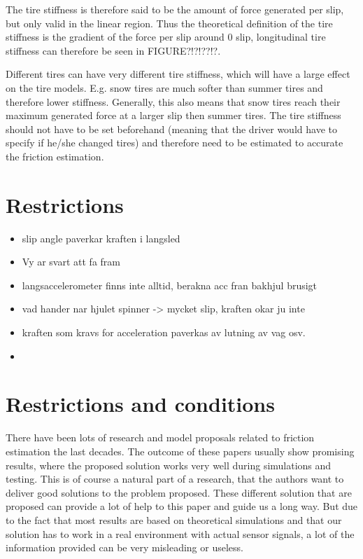 The tire stiffness is therefore said to be the amount of force generated per slip, but only valid in the linear region. Thus the theoretical definition of the tire stiffness is the gradient of the force per slip around 0 slip, longitudinal tire stiffness can therefore be seen in FIGURE?!?!??!?. 

Different tires can have very different tire stiffness, which will have a large effect on the tire models. E.g. snow tires are much softer than summer tires and therefore lower stiffness. Generally, this also means that snow tires reach their maximum generated force at a larger slip then summer tires. The tire stiffness should not have to be set beforehand (meaning that the driver would have to specify if he/she changed tires) and therefore need to be estimated to accurate the friction estimation.
\section{Restrictions}

\begin{itemize}
	\item slip angle paverkar kraften i langsled
	\item Vy ar svart att fa fram
	\item langsaccelerometer finns inte alltid, berakna acc fran bakhjul brusigt
	\item vad hander nar hjulet spinner -> mycket slip, kraften okar ju inte
	\item kraften som kravs for acceleration paverkas av lutning av vag osv.
	\item 
\end{itemize}

\section{Restrictions and conditions}
There have been lots of research and model proposals related to friction estimation the last decades. The outcome of these papers usually show promising results, where the proposed solution works very well during simulations and testing. This is of course a natural part of a research, that the authors want to deliver good solutions to the problem proposed. These different solution that are proposed can provide a lot of help to this paper and guide us a long way. But due to the fact that most results are based on theoretical simulations and that our solution has to work in a real environment with actual sensor signals, a lot of the information provided can be very misleading or useless. 


